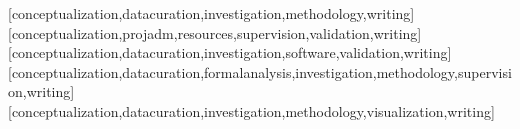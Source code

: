 \documentclass[english]{textolivre}
\begin{document}
\begin{contributors}
[conceptualization,datacuration,investigation,methodology,writing]
[conceptualization,projadm,resources,supervision,validation,writing]
[conceptualization,datacuration,investigation,software,validation,writing]
[conceptualization,datacuration,formalanalysis,investigation,methodology,supervision,writing]
[conceptualization,datacuration,investigation,methodology,visualization,writing]
\end{contributors}
\end{document}
